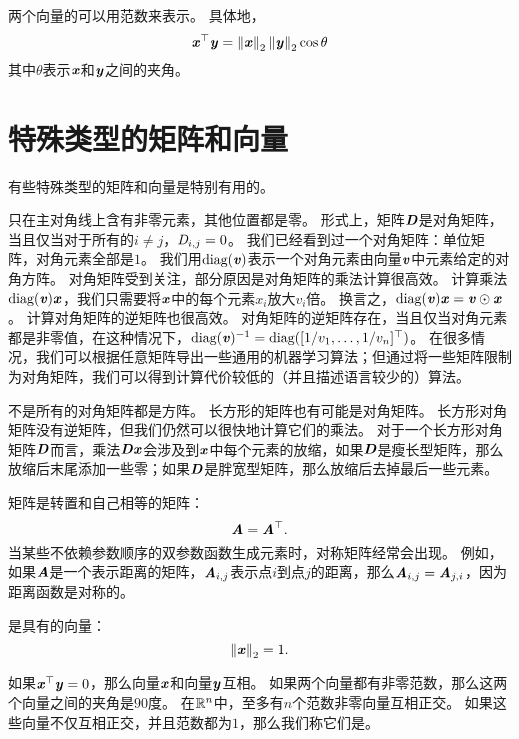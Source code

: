 两个向量的可以用范数来表示。
具体地，
\begin{equation}
    \Vx^\top\Vy = \norm{\Vx}_2\norm{\Vy}_2 \cos \theta
\end{equation}
其中$\theta$表示$\Vx$和$\Vy$之间的夹角。




\section{特殊类型的矩阵和向量}
\label{sec:special_kinds_of_matrices_and_vectors}

有些特殊类型的矩阵和向量是特别有用的。


只在主对角线上含有非零元素，其他位置都是零。
形式上，矩阵$\MD$是对角矩阵，当且仅当对于所有的$i\neq j$，$\SD_{i,j}=0$。
我们已经看到过一个对角矩阵：单位矩阵，对角元素全部是$1$。
我们用$\text{diag}(\Vv)$表示一个对角元素由向量$\Vv$中元素给定的对角方阵。
对角矩阵受到关注，部分原因是对角矩阵的乘法计算很高效。
计算乘法$\text{diag}(\Vv)\Vx$，我们只需要将$\Vx$中的每个元素$x_i$放大$v_i$倍。
换言之，$\text{diag}(\Vv)\Vx=\Vv \odot \Vx$。
计算对角矩阵的逆矩阵也很高效。
对角矩阵的逆矩阵存在，当且仅当对角元素都是非零值，在这种情况下，$\text{diag}(\Vv)^{-1}=\text{diag}([1/v_1,\dots,1/v_n]^\top)$。
在很多情况，我们可以根据任意矩阵导出一些通用的机器学习算法；但通过将一些矩阵限制为对角矩阵，我们可以得到计算代价较低的（并且描述语言较少的）算法。


不是所有的对角矩阵都是方阵。
长方形的矩阵也有可能是对角矩阵。
长方形对角矩阵没有逆矩阵，但我们仍然可以很快地计算它们的乘法。
对于一个长方形对角矩阵$\MD$而言，乘法$\MD\Vx$会涉及到$\Vx$中每个元素的放缩，如果$\MD$是瘦长型矩阵，那么放缩后末尾添加一些零；如果$\MD$是胖宽型矩阵，那么放缩后去掉最后一些元素。



矩阵是转置和自己相等的矩阵：
\begin{equation}
    \MA=\MA^\top.
\end{equation}
当某些不依赖参数顺序的双参数函数生成元素时，对称矩阵经常会出现。
例如，如果$\MA$是一个表示距离的矩阵，$\MA_{i,j}$表示点$i$到点$j$的距离，那么$\MA_{i,j}=\MA_{j,i}$，因为距离函数是对称的。


是具有的向量：
\begin{equation}
\norm{\Vx}_2=1.
\end{equation}


如果$\Vx^\top \Vy = 0$，那么向量$\Vx$和向量$\Vy$互相。
如果两个向量都有非零范数，那么这两个向量之间的夹角是$90$度。
在$\SetR^n$中，至多有$n$个范数非零向量互相正交。
如果这些向量不仅互相正交，并且范数都为$1$，那么我们称它们是。



